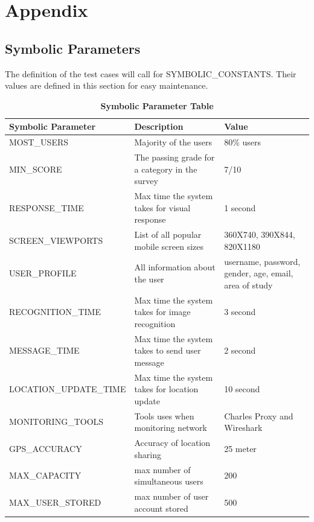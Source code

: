 \documentclass[12pt]{article}
\begin{document}
\newpage{}

\section{Appendix}
\subsection{Symbolic Parameters}
The definition of the test cases will call for SYMBOLIC\_CONSTANTS.
Their values are defined in this section for easy maintenance.

\begin{table}[H]
\caption{\bf Symbolic Parameter Table}
\begin{tabular}{|p{0.4\linewidth} | p{0.3\linewidth}| p{0.3\linewidth} |}
\hline
\multicolumn{1}{|l}{\bfseries Symbolic Parameter} & \multicolumn{1}{|l|}{\bfseries Description} & \multicolumn{1}{l|}{\bfseries Value}\\
\hline
MOST\_USERS & Majority of the users & 80\% users \\
\hline
MIN\_SCORE & The passing grade for a category in the survey & 7/10\\
\hline
RESPONSE\_TIME & Max time the system takes for visual response & 1 second\\
\hline
SCREEN\_VIEWPORTS & List of all popular mobile screen sizes & 360X740, 390X844, 820X1180\\
\hline
USER\_PROFILE & All information about the user & username, password, gender, age, email, area of study\\
\hline
RECOGNITION\_TIME & Max time the system takes for image recognition & 3 second\\
\hline
MESSAGE\_TIME & Max time the system takes to send user message & 2 second\\
\hline
LOCATION\_UPDATE\_TIME & Max time the system takes for location update & 10 second\\
\hline
MONITORING\_TOOLS & Tools uses when monitoring network & Charles Proxy and Wireshark\\
\hline
GPS\_ACCURACY & Accuracy of location sharing & 25 meter\\
\hline
MAX\_CAPACITY & max number of simultaneous users & 200\\
\hline
MAX\_USER\_STORED & max number of user account stored & 500\\
\hline
\end{tabular}
\end{table}
\end{document}
